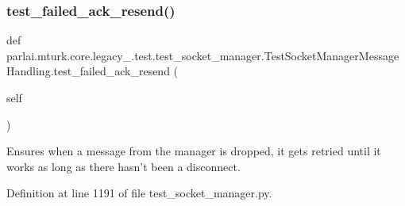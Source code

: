 \subsubsection{\texorpdfstring{test\+\_\+failed\+\_\+ack\+\_\+resend()}{test\_failed\_ack\_resend()}}
{\footnotesize\ttfamily def parlai.\+mturk.\+core.\+legacy\+\_.\+test.\+test\+\_\+socket\+\_\+manager.\+Test\+Socket\+Manager\+Message\+Handling.\+test\+\_\+failed\+\_\+ack\+\_\+resend (\begin{DoxyParamCaption}\item[{}]{self }\end{DoxyParamCaption})}

\begin{DoxyVerb}Ensures when a message from the manager is dropped, it gets retried until it
works as long as there hasn't been a disconnect.
\end{DoxyVerb}
 

Definition at line 1191 of file test\+\_\+socket\+\_\+manager.\+py.


